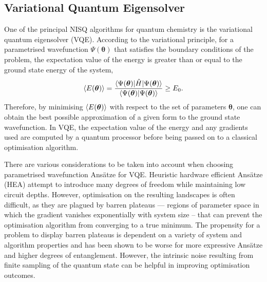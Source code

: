\documentclass[%
 reprint,
 amsmath,amssymb,
 aps,
]{revtex4-2}
\begin{document}
\subsection{Variational Quantum Eigensolver}

One of the principal NISQ algorithms for quantum chemistry is the variational quantum eigensolver (VQE).\cite{Peruzzo2014} According to the variational principle, for a parametrised wavefunction $\Psi(\boldsymbol{\theta})$ that satisfies the boundary conditions of the problem, the expectation value of the energy is greater than or equal to the ground state energy of the system,
\begin{equation}
\braket{E(\boldsymbol{\theta})} = \frac{\braket{\Psi(\boldsymbol\theta)|\hat H | \Psi(\boldsymbol{\theta})}}{\braket{\Psi(\boldsymbol{\theta})| \Psi(\boldsymbol{\theta})}} \geq E_0.
\end{equation}
Therefore, by minimising $\braket{E(\boldsymbol{\theta})}$ with respect to the set of parameters $\boldsymbol{\theta}$, one can obtain the best possible approximation of a given form to the ground state wavefunction.
In VQE, the expectation value of the energy and any gradients used are computed by a quantum processor before being passed on to a classical optimisation algorithm.

There are various considerations to be taken into account when choosing parametrised wavefunction Ans\"atze for VQE. Heuristic hardware efficient Ans\"atze (HEA)\cite{Kandala2017} attempt to introduce many degrees of freedom while maintaining low circuit depths. However, optimisation on the resulting landscapes is often difficult, as they are plagued by barren plateaus\cite{McClean2018, Fontana2023} --- regions of parameter space in which the gradient vanishes exponentially with system size -- that can prevent the optimisation algorithm from converging to a true minimum. { The propensity for a problem to display barren plateaus is dependent on a variety of system and algorithm properties\cite{Ragone2023} and} has been shown to be worse for more expressive Ans\"atze \cite{Holmes2022} and higher degrees of entanglement.\cite{Marrero2021} However, the intrinsic noise resulting from finite sampling of the quantum state can be helpful in improving optimisation outcomes.\cite{Liu2023} 
\end{document}
